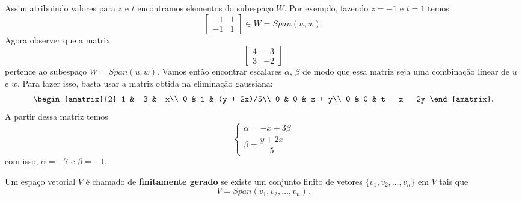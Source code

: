 \begin{exemplos}
\begin{enumerate}
\begin{solucao}
\[            \]
            Assim atribuindo valores para $z$ e $t$ encontramos elementos do subespaço $W$. Por exemplo, fazendo $z = -1$ e $t = 1$ temos
            \[
                \begin{bmatrix}-1 & 1\\-1 & 1 \end{bmatrix} \in W = Span(u, w).
            \]
            Agora observer que a matrix
            \[
                \begin{bmatrix}
                    4 & -3\\
                    3 & -2
                \end{bmatrix}
            \]
            pertence ao subespaço $W = Span(u, w)$. Vamos então encontrar escalares $\alpha$, $\beta$ de modo que essa matriz seja uma combinação linear de $u$ e $w$. Para fazer isso, basta usar a matriz obtida na eliminação gaussiana:
            \[
                \begin{amatrix}{2}
                    1 & -3 & -x\\
                    0 & 1 & (y + 2x)/5\\
                    0 & 0 & z + y\\
                    0 & 0 & t - x - 2y
                \end{amatrix}.
            \]
            A partir dessa matriz temos
            \[
                \begin{cases}
                    \alpha = -x + 3\beta\\
                    \beta = \dfrac{y + 2x}{5}
                \end{cases}
            \]
            com isso, $\alpha = -7$ e $\beta = -1$.
        \end{solucao}

    \end{enumerate}
\end{exemplos}

\begin{definicao}
    Um espaço vetorial $V$ é chamado de \textbf{finitamente gerado} se existe um conjunto finito de vetores $\{v_1, v_2, \dots, v_n\}$ em $V$ tais que
    \[
        V = Span(v_1, v_2, \dots, v_n).
    \]
\end{definicao}



